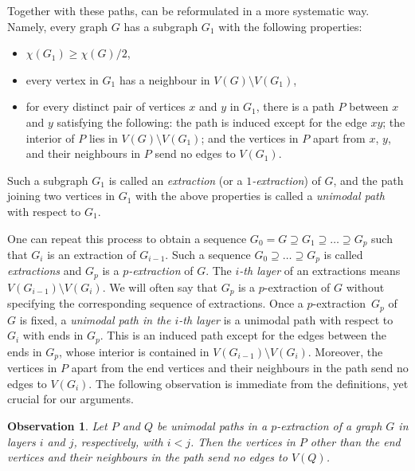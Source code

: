 \documentclass[11pt,english]{article}
\theoremstyle{plain}
\newtheorem{obs}[thm]{Observation}
\theoremstyle{definition}
\theoremstyle{remark}
\begin{document}
    Together with these paths,  can be reformulated in a more systematic way.
    Namely, every graph $G$ has a subgraph $G_1$ with the following properties: 
    \begin{itemize}
        \item 
            $\chi(G_1) \ge \chi(G)/2$,
        \item
            every vertex in $G_1$ has a neighbour in $V(G) \setminus V(G_1)$,
        \item
            for every distinct pair of vertices $x$ and $y$ in $G_1$, there is a path $P$ between $x$ and $y$ satisfying the following: the path is induced except for the edge $xy$; the interior of $P$ lies in $V(G) \setminus V(G_1)$; and the vertices in $P$ apart from $x$, $y$, and their neighbours in $P$ send no edges to $V(G_1)$.
    \end{itemize}
    Such a subgraph $G_1$ is called an \emph{extraction} (or a \emph{$1$-extraction}) of $G$, and the path joining two vertices in $G_1$ with the above properties is called a \emph{unimodal path} with respect to $G_1$. 
    
    One can repeat this process to obtain a sequence $G_0 = G \supseteq G_1 \supseteq \ldots \supseteq G_p$ such that $G_{i}$ is an extraction of $G_{i-1}$. Such a sequence $G_0 \supseteq \ldots \supseteq G_p$ is called \emph{extractions} and $G_p$ is a \emph{$p$-extraction} of $G$. 
    The \emph{$i$-th layer} of an extractions means $V(G_{i-1}) \setminus V(G_{i})$.
    We will often say that $G_p$ is a $p$-extraction of $G$ without specifying the corresponding sequence of extractions.
    Once a $p$-extraction~$G_p$ of $G$ is fixed, a \emph{unimodal path in the $i$-th layer} is a unimodal path with respect to $G_i$ with ends in $G_p$. 
    This is an induced path except for the edges between the ends in $G_p$, whose interior is contained in $V(G_{i-1}) \setminus V(G_i)$. 
    Moreover, the vertices in $P$ apart from the end vertices and their neighbours in the path send no edges to $V(G_i)$. 
    The following observation is immediate from the definitions, yet crucial for our arguments.
    
    \begin{obs} \label{obs:unimodal}
        Let $P$ and $Q$ be unimodal paths in a $p$-extraction of a graph $G$ in layers $i$ and $j$, respectively, with $i < j$.
        Then the vertices in $P$ other than the end vertices and their neighbours in the path send no edges to $V(Q)$.
    \end{obs}
    
\end{document}
